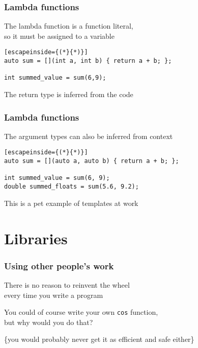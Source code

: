 \documentclass[14pt,a4paper,dvipsnames,usenames]{beamer}
\begin{document}
\begin{frame}[fragile]
  \frametitle{Lambda functions}

  The lambda function is a function literal,\\so it must be assigned to a variable

  \vspace{1em}
  \begin{lstlisting}[escapeinside={(*}{*)}]
auto sum = [](int a, int b) { return a + b; };

int summed_value = sum(6,9);
  \end{lstlisting}

  \vspace{1em}
  The return type is inferred from the code

  \CPPEleven
  
\end{frame}

\begin{frame}[fragile]
  \frametitle{Lambda functions}

  The argument types can also be inferred from context

  \vspace{1em}
  \begin{lstlisting}[escapeinside={(*}{*)}]
auto sum = [](auto a, auto b) { return a + b; };

int summed_value = sum(6, 9);
double summed_floats = sum(5.6, 9.2);
  \end{lstlisting}

  \vspace{1em}
  This is a pet example of templates at work

  \CPPFourteen
  
\end{frame}

\LiveFrame

\section{Libraries}

\frame[plain]{\sectionpage}

\begin{frame}
  \frametitle{Using other people's work}

  There is no reason to reinvent the wheel\\every time you write a program

  \vspace{1em}
  You could of course write your own \lstinline!cos! function,\\but why would you do that?

  \vspace{.2em}
  {\footnotesize
    \{you would probably never get it as efficient and safe either\}
  }
  
\end{frame}
\end{document}
